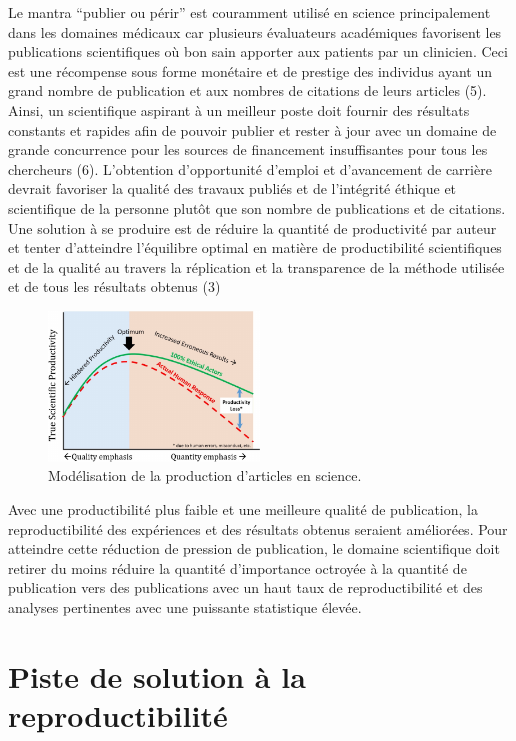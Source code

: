 \documentclass[9pt,twocolumn,twoside,]{pnas-new}
\begin{document}
Le mantra ``publier ou périr'' est couramment utilisé en science
principalement dans les domaines médicaux car plusieurs évaluateurs
académiques favorisent les publications scientifiques où bon sain
apporter aux patients par un clinicien. Ceci est une récompense sous
forme monétaire et de prestige des individus ayant un grand nombre de
publication et aux nombres de citations de leurs articles (5). Ainsi, un
scientifique aspirant à un meilleur poste doit fournir des résultats
constants et rapides afin de pouvoir publier et rester à jour avec un
domaine de grande concurrence pour les sources de financement
insuffisantes pour tous les chercheurs (6). L'obtention d'opportunité
d'emploi et d'avancement de carrière devrait favoriser la qualité des
travaux publiés et de l'intégrité éthique et scientifique de la personne
plutôt que son nombre de publications et de citations. Une solution à se
produire est de réduire la quantité de productivité par auteur et tenter
d'atteindre l'équilibre optimal en matière de productibilité
scientifiques et de la qualité au travers la réplication et la
transparence de la méthode utilisée et de tous les résultats obtenus (3)

\begin{figure}
\centering
\includegraphics[width=0.5\textwidth,height=0.4\textheight]{"../Article_de_Edouard/image.pdf"}
\caption{Modélisation de la production d'articles en science.
\label{fig:plot1}}
\end{figure}

Avec une productibilité plus faible et une meilleure qualité de
publication, la reproductibilité des expériences et des résultats
obtenus seraient améliorées. Pour atteindre cette réduction de pression
de publication, le domaine scientifique doit retirer du moins réduire la
quantité d'importance octroyée à la quantité de publication vers des
publications avec un haut taux de reproductibilité et des analyses
pertinentes avec une puissante statistique élevée.

\hypertarget{piste-de-solution-uxe0-la-reproductibilituxe9}{%
\section{Piste de solution à la
reproductibilité}\label{piste-de-solution-uxe0-la-reproductibilituxe9}}
\end{document}
